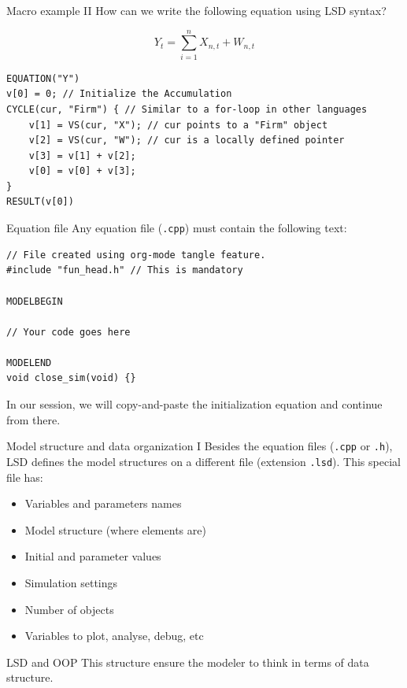 \documentclass[bigger,aspectratio=169]{beamer}
\begin{document}
\begin{frame}[label={sec:orge68cd32},fragile]{Macro example II}
 How can we write the following equation using LSD syntax?

\[Y_{t} = \sum_{i=1}^{n} X_{n,t} + W_{n,t}\]


\begin{verbatim}
EQUATION("Y")
v[0] = 0; // Initialize the Accumulation
CYCLE(cur, "Firm") { // Similar to a for-loop in other languages
    v[1] = VS(cur, "X"); // cur points to a "Firm" object
    v[2] = VS(cur, "W"); // cur is a locally defined pointer
    v[3] = v[1] + v[2];
    v[0] = v[0] + v[3];
}
RESULT(v[0])
\end{verbatim}
\end{frame}
\begin{frame}[label={sec:org6d02656},fragile]{Equation file}
 Any equation file (\texttt{.cpp}) must contain the following text:
\begin{verbatim}
// File created using org-mode tangle feature.
#include "fun_head.h" // This is mandatory

MODELBEGIN

// Your code goes here

MODELEND
void close_sim(void) {}
\end{verbatim}

In our session, we will copy-and-paste the initialization equation and continue from there.
\end{frame}
\begin{frame}[label={sec:orgd674e14},fragile]{Model structure and data organization I}
 Besides the equation files (\texttt{.cpp} or \texttt{.h}), LSD defines the model structures on a different file (extension \texttt{.lsd}).
This special file has:

\begin{itemize}
\item Variables and parameters names
\item Model structure (where elements are)
\item Initial and parameter values
\item Simulation settings
\item Number of objects
\item Variables to plot, analyse, debug, etc
\end{itemize}
\begin{block}{LSD and OOP}
This structure ensure the modeler to think in terms of data structure.
\end{block}
\end{frame}
\end{document}
